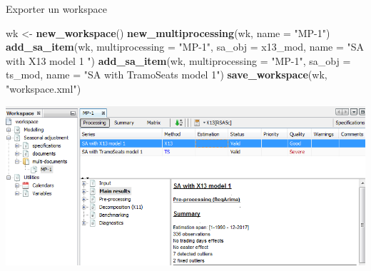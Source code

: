 \documentclass[10pt,xcolor=table,color={dvipsnames,usenames},ignorenonframetext,usepdftitle=false,french]{beamer}
\newenvironment{Shaded}{\begin{snugshade}}{\end{snugshade}}
\newcommand{\DataTypeTok}[1]{\textcolor[rgb]{0.13,0.29,0.53}{#1}}
\newcommand{\KeywordTok}[1]{\textcolor[rgb]{0.13,0.29,0.53}{\textbf{#1}}}
\newcommand{\NormalTok}[1]{#1}
\newcommand{\StringTok}[1]{\textcolor[rgb]{0.31,0.60,0.02}{#1}}
\begin{document}
\begin{frame}[fragile]{Exporter un workspace}
\protect\hypertarget{exporter-un-workspace}{}

\footnotesize

\begin{Shaded}
\begin{Highlighting}[]
\NormalTok{wk <-}\StringTok{ }\KeywordTok{new_workspace}\NormalTok{()}
\KeywordTok{new_multiprocessing}\NormalTok{(wk, }\DataTypeTok{name =} \StringTok{"MP-1"}\NormalTok{)}
\KeywordTok{add_sa_item}\NormalTok{(wk, }\DataTypeTok{multiprocessing =} \StringTok{"MP-1"}\NormalTok{,}
            \DataTypeTok{sa_obj =}\NormalTok{ x13_mod, }\DataTypeTok{name =}  \StringTok{"SA with X13 model 1 "}\NormalTok{)}
\KeywordTok{add_sa_item}\NormalTok{(wk, }\DataTypeTok{multiprocessing =}  \StringTok{"MP-1"}\NormalTok{,}
            \DataTypeTok{sa_obj =}\NormalTok{ ts_mod, }\DataTypeTok{name =} \StringTok{"SA with TramoSeats model 1"}\NormalTok{)}
\KeywordTok{save_workspace}\NormalTok{(wk, }\StringTok{"workspace.xml"}\NormalTok{)}
\end{Highlighting}
\end{Shaded}

\includegraphics{img/workspace.png}

\end{frame}
\end{document}
